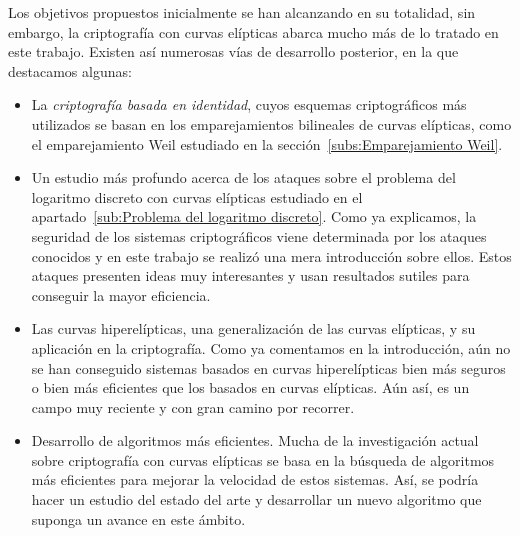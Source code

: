 Los objetivos propuestos inicialmente se han alcanzando en su totalidad, sin embargo, la criptografía con curvas elípticas abarca mucho más de lo tratado en este trabajo. Existen así numerosas vías de desarrollo posterior, en la que destacamos algunas:
\begin{itemize}
    \item La \emph{criptografía basada en identidad}, cuyos esquemas criptográficos más utilizados se basan en los emparejamientos bilineales de curvas elípticas, como el emparejamiento Weil estudiado en la sección~\ref{subs:Emparejamiento Weil}.
    \item Un estudio más profundo acerca de los ataques sobre el problema del logaritmo discreto con curvas elípticas estudiado en el apartado~\ref{sub:Problema del logaritmo discreto}. Como ya explicamos, la seguridad de los sistemas criptográficos viene determinada por los ataques conocidos y en este trabajo se realizó una mera introducción sobre ellos. Estos ataques presenten ideas muy interesantes y usan resultados sutiles para conseguir la mayor eficiencia.
    \item Las curvas hiperelípticas, una generalización de las curvas elípticas, y su aplicación en la criptografía. Como ya comentamos en la introducción, aún no se han conseguido sistemas basados en curvas hiperelípticas bien más seguros o bien más eficientes que los basados en curvas elípticas. Aún así, es un campo muy reciente y con gran camino por recorrer.
    \item Desarrollo de algoritmos más eficientes. Mucha de la investigación actual sobre criptografía con curvas elípticas se basa en la búsqueda de algoritmos más eficientes para mejorar la velocidad de estos sistemas. Así, se podría hacer un estudio del estado del arte y desarrollar un nuevo algoritmo que suponga un avance en este ámbito.
\end{itemize}
